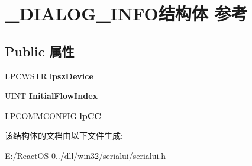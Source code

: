 \hypertarget{struct___d_i_a_l_o_g___i_n_f_o}{}\section{\+\_\+\+D\+I\+A\+L\+O\+G\+\_\+\+I\+N\+F\+O结构体 参考}
\label{struct___d_i_a_l_o_g___i_n_f_o}
\subsection*{Public 属性}
\begin{DoxyCompactItemize}
\item 
\mbox{\label{struct___d_i_a_l_o_g___i_n_f_o_aeff241d3e459f4cb803e54121017731f}} 
L\+P\+C\+W\+S\+TR {\bfseries lpsz\+Device}
\item 
\mbox{\label{struct___d_i_a_l_o_g___i_n_f_o_a6247c5a07a793b5c8b565e47de08c962}} 
U\+I\+NT {\bfseries Initial\+Flow\+Index}
\item 
\mbox{\label{struct___d_i_a_l_o_g___i_n_f_o_a61f22c6d8c98df7922a4b49c8cac5f40}} 
\hyperlink{struct___c_o_m_m___c_o_n_f_i_g}{L\+P\+C\+O\+M\+M\+C\+O\+N\+F\+IG} {\bfseries lp\+CC}
\end{DoxyCompactItemize}


该结构体的文档由以下文件生成\+:\begin{DoxyCompactItemize}
\item 
E\+:/\+React\+O\+S-\/0../dll/win32/serialui/serialui.\+h\end{DoxyCompactItemize}
